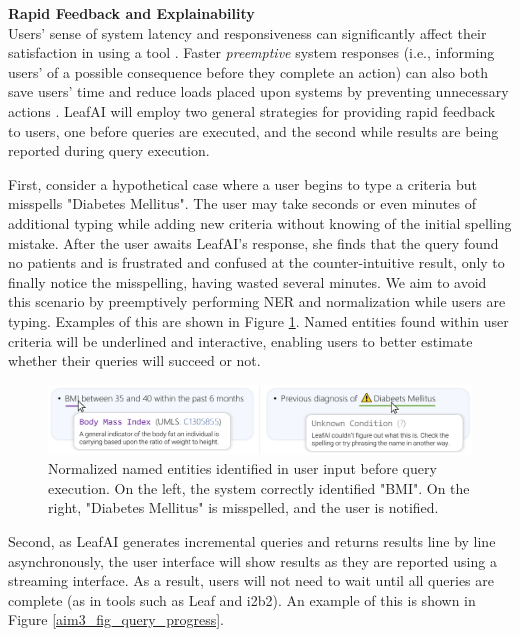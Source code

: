 \documentclass[../main.tex]{subfiles}
\begin{document}
\noindent \textbf{Rapid Feedback and Explainability} \\
Users' sense of system latency and responsiveness can significantly affect their satisfaction in using a tool \cite{li2019effects, arapakis2014impact, shneiderman1984response}. Faster \textit{preemptive} system responses (i.e., informing users' of a possible consequence before they complete an action) can also both save users' time and reduce loads placed upon systems by preventing unnecessary actions \cite{lempel2003predictive, diaz2016search}. LeafAI will employ two general strategies for providing rapid feedback to users, one before queries are executed, and the second while results are being reported during query execution.

First, consider a hypothetical case where a user begins to type a criteria but misspells "Diabetes Mellitus". The user may take seconds or even minutes of additional typing while adding new criteria without knowing of the initial spelling mistake. After the user awaits LeafAI's response, she finds that the query found no patients and is frustrated and confused at the counter-intuitive result, only to finally notice the misspelling, having wasted several minutes. We aim to avoid this scenario by preemptively performing NER and normalization while users are typing. Examples of this are shown in Figure \ref{aim3_fig_mouse_hover}. Named entities found within user criteria will be underlined and interactive, enabling users to better estimate whether their queries will succeed or not.

\begin{figure}[h!]
  \centering
  \includegraphics[scale=0.68]{Figures/Aim3/aim3_mouse_hover.pdf}  
  \caption{Normalized named entities identified in user input before query execution. On the left, the system correctly identified "BMI". On the right, "Diabetes Mellitus" is misspelled, and the user is notified.}
\label{aim3_fig_mouse_hover}
\end{figure}

Second, as LeafAI generates incremental queries and returns results line by line asynchronously, the user interface will show results as they are reported using a streaming interface. As a result, users will not need to wait until all queries are complete (as in tools such as Leaf and i2b2). An example of this is shown in Figure \ref{aim3_fig_query_progress}.
\end{document}
